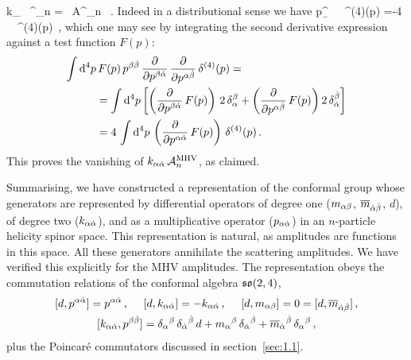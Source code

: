 k_{\a\da} \, \cA^_n =
 \, A^_n \, .
\ee
%
Indeed in a distributional sense we have
%
\be
p^{\b\db}\, 
 \, \, \delta^{(4)}(p)
=-4 \, \, \delta^{(4)}(p)\, ,
\ee
%
which one may see by integrating the second derivative expression against a test function $F(p)$:
\begin{align} \begin{aligned}
\int \mathrm{d}^4 p &\, F(p)\, p^{\beta{\dot{\beta}}}\, 
\frac{\partial}{\partial p^{\beta{\dot{\alpha}}}} \, \frac{\partial}{\partial p^{\alpha{\dot{\beta}}}}\, \delta^{(4)}(p)
= \\
&
= \int \mathrm{d}^4 p \left[ \left( \frac{\partial}{\partial p^{\beta{\dot{\alpha}}}}\, F(p)\right) \, 2\, \delta^{\beta}_{\alpha}
+ \left( \frac{\partial}{\partial p^{\alpha{\dot{\beta}}}}\, F(p)\right) 2\, \delta^{{\dot{\beta}}}_{{\dot{\alpha}}} 
\right] \\
&= 4\, \int \mathrm{d}^4 p  \, \left(\frac{\partial}{\partial p^{\alpha{\dot{\alpha}}}}\, F(p) \right)\, \delta^{(4)}(p)
\, .
\end{aligned} \end{align}
This proves the vanishing of $k_{\alpha{\dot{\alpha}}} \, \mathcal{A}^\text{MHV}_n$, as claimed.

Summarising, we have constructed a representation of the conformal group whose generators are represented
by differential operators of degree one ($m_{\alpha\beta}$, ${{\overline m}}_{{\dot{\alpha}}{\dot{\beta}}}$, $d$), of degree
two ($k_{\alpha{\dot{\alpha}}}$), and as a multiplicative operator ($p_{\alpha{\dot{\alpha}}}$) in an $n$-particle
 helicity spinor
space. This representation is natural, as amplitudes are functions in this
space. All these generators
annihilate the scattering amplitudes. 
We have verified this explicitly for the MHV amplitudes.
The representation obeys the
 commutation relations of the conformal algebra $\mathfrak{so}(2,4)$, 
%
\begin{align} \label{confalgebra}
\begin{gathered} 
[d,p^{\a\da}]  = p^{\a\da} \,, \quad \ 
  [d,k_{\a\da}] = -k_{\a\da} \,, \quad \ 
  [d,m_{\a\b}]=0=[d,{{\overline m}}_{\da\db}] \,, \\
[k_{\a\da}, p^{\b\db}] = \delta_\a{}^\b \, \delta_\da{}^\db \, d + m_\a{}^\b\, \delta_\da{}^\db 
  +{{\overline m}}_\da{}^\db\, \delta_\a{}^\b \,,
\end{gathered}
\end{align}
%
plus the Poincar\'e commutators discussed in section~\ref{sec:1.1}.
 
